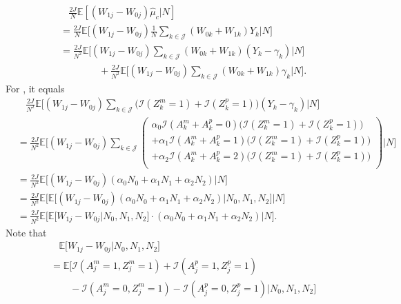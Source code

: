\documentclass[12pt]{extarticle}
\newcommand{\E}{\mathbb{E}}
\newcommand{\nind}{J}
\newcommand{\indicator}{\mathcal{I}}
\newcommand{\cJ}{\mathcal{J}}
\begin{document}
{{\begin{align}
& ~~~~ \frac{2\nind}{N}\E[(W_{1j}-W_{0j})\hat{\mu}_c|N] \nonumber \\
& = \frac{2\nind}{N}\E\Big[(W_{1j}-W_{0j})\frac{1}{N}\sum_{k\in \cJ}(W_{0k}+W_{1k})Y_k\Big|N\Big] \nonumber \\
& = \frac{2\nind}{N^2}\E\Big[(W_{1j}-W_{0j})\sum_{k\in \cJ}(W_{0k}+W_{1k})(Y_k-\gamma_k) \Big|N\Big] \tag{A5.b} \label{eq:c2} \\
& \qquad \qquad + \frac{2\nind}{N^2} \E\Big[(W_{1j}-W_{0j})\sum_{k\in \cJ}(W_{0k}+W_{1k})\gamma_k \Big|N\Big]. \tag{A5.c} \label{eq:c3}
\end{align}}For , it equals 
{\allowdisplaybreaks 
\begin{align}
& ~~~~ \frac{2\nind}{N^2}\E\Big[(W_{1j}-W_{0j})\sum_{k\in \cJ}\big(\indicator(Z^m_k=1)+\indicator(Z^p_k=1)\big)(Y_k-\gamma_k)\Big|N\Big] \nonumber \\
& = \frac{2\nind}{N^2}\E\Big[(W_{1j}-W_{0j})\sum_{k\in \cJ}\left(
         \begin{array}{l}
         \alpha_0 \indicator(A^m_k+A^p_k=0)\big(\indicator(Z^m_k=1)+ \indicator(Z^p_k=1)\big) \\
         + \alpha_1 \indicator(A^m_k+A^p_k=1)\big(\indicator(Z^m_k=1)+ \indicator(Z^p_k=1)\big) \\
         + \alpha_2 \indicator(A^m_k+A^p_k=2)\big(\indicator(Z^m_k=1)+ \indicator(Z^p_k=1)\big) \\
         \end{array}\right) \Big|N\Big]  \nonumber \\
&= \frac{2\nind}{N^2} \E\Big[(W_{1j}-W_{0j})(\alpha_0 N_0 + \alpha_1 N_1 + \alpha_2 N_2)\Big|N\Big] \nonumber \\
& = \frac{2\nind}{N^2} \E\Big[\E\big[(W_{1j}-W_{0j})(\alpha_0 N_0 + \alpha_1 N_1 + \alpha_2 N_2)\big|N_0,N_1,N_2\big]\Big|N\Big] \nonumber \\
& = \frac{2\nind}{N^2} \E\Big[\E\big[W_{1j}-W_{0j}|N_0,N_1,N_2\big] \cdot (\alpha_0 N_0 + \alpha_1 N_1 + \alpha_2 N_2)\Big|N\Big]. \nonumber 
\end{align}} 
Note that 
{\allowdisplaybreaks \begin{align*}
& ~~~~ \E\Big[W_{1j}-W_{0j}\Big|N_0,N_1,N_2\Big] \nonumber \\
& = \E\Big[\indicator(A^m_j=1,Z^m_j=1)+\indicator(A^p_j=1,Z^p_j=1) ~ \nonumber \\
& \qquad - \indicator(A^m_j=0,Z^m_j=1) - \indicator(A^p_j=0,Z^p_j=1) \Big|N_0,N_1,N_2\Big] \nonumber \\

\end{align*}}}
\end{document}
